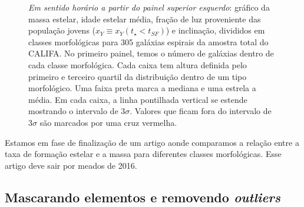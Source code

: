 \begin{figure}
	\centering
	\caption[Classificação por morfologia.]
	{\emph{Em sentido horário a partir do painel superior esquerdo}: gráfico da massa estelar, idade
	estelar média, fração de luz proveniente das população jovens ($x_Y \equiv x_Y(t_\star < t_{SF})$) e
	inclinação, divididos em classes morfológicas para 305 galáxias espirais da amostra total do
	CALIFA. No primeiro painel, temos o número de galáxias dentro de cada classe morfológica. Cada
	caixa tem altura definida pelo primeiro e terceiro quartil da distribuição dentro de um tipo
	morfológico. Uma faixa preta marca a mediana e uma estrela a média. Em cada caixa, a linha
	pontilhada vertical se estende mostrando o intervalo de $3\sigma$. Valores que ficam fora do
	intervalo de $3\sigma$ são marcados por uma cruz vermelha.}
	\label{fig:amostraMorf}
\end{figure}

Estamos em fase de finalização de um artigo aonde comparamos a relação entre a taxa de formação
estelar e a massa para diferentes classes morfológicas. Esse artigo deve sair por meados de 2016.

\subsection{Mascarando elementos e removendo {\em outliers}}
\label{sec:synvsneb:amostra:mask}

